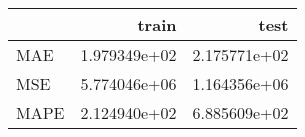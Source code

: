 \begin{tabular}{lrr}
\toprule
{} &         train &          test \\
\midrule
MAE  &  1.979349e+02 &  2.175771e+02 \\
MSE  &  5.774046e+06 &  1.164356e+06 \\
MAPE &  2.124940e+02 &  6.885609e+02 \\
\bottomrule
\end{tabular}

